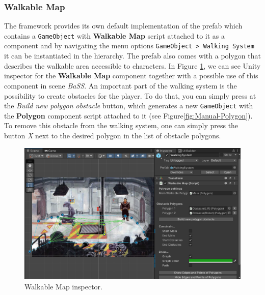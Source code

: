 \subsubsection{Walkable Map}
\label{Manual:WM}
The framework provides its own default implementation of the prefab which contains a \verb|GameObject| with \textbf{Walkable Map} script attached to it as a component and by navigating the menu options \verb|GameObject > Walking System| it can be instantiated in the hierarchy. The prefab also comes with a polygon that describes the walkable area accessible to characters. In Figure \ref{fig:Manual-WM}, we can see Unity inspector for the \textbf{Walkable Map} component together with a possible use of this component in scene \textit{BaSS}. An important part of the walking system is the possibility to create obstacles for the player. To do that, you can simply press at the \textit{Build new polygon obstacle} button, which generates a new \verb|GameObject| with the \textbf{Polygon} component script attached to it (see Figure\ref{fig:Manual-Polygon}). To remove this obstacle from the walking system, one can simply press the button \textit{X} next to the desired polygon in the list of obstacle polygons. 

\begin{figure}[H]
\centering
\includegraphics[width=1\linewidth]{img/User doc/walkable_map.png}
\caption{Walkable Map inspector.}
\label{fig:Manual-WM}
\end{figure}

